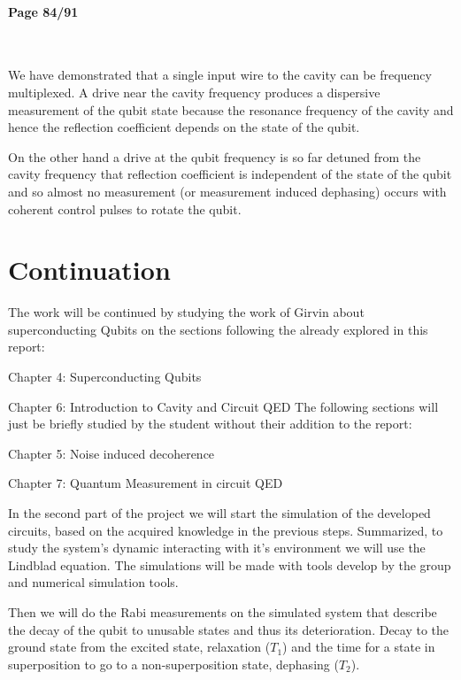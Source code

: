 \documentclass[12pt]{article}
\let\tempone\itemize
\let\temptwo\enditemize
\renewenvironment{itemize}{\tempone\setlength{\itemsep}{0pt}}{\temptwo}
\numberwithin{equation}{subsection}
\newcommand\page[1]{
{
\color{blue}\paragraph{
Page #1
}\mbox{}\\
}
}
\begin{document}
\page{84/91}

We have demonstrated that a single input wire to the cavity can be frequency multiplexed. 
A drive near the cavity frequency produces a dispersive measurement of the qubit state because the resonance frequency of the cavity and  hence the reflection coefficient depends on the state of the qubit. 

On the other hand a drive at the qubit frequency is so far detuned from the cavity frequency that reflection coefficient is independent of the state of the qubit and so almost no measurement (or measurement induced dephasing) occurs with coherent control pulses to rotate the qubit.


\section{Continuation}
The work will be continued by studying the work of Girvin about superconducting Qubits on the sections following the already explored in this report: 
\begin{itemize}
    \item Chapter 4: Superconducting Qubits
    \item Chapter 6: Introduction to Cavity and Circuit QED
\end{itemize}
The following sections will just be briefly studied by the student without their addition to the report:

\begin{itemize}
    \item Chapter 5: Noise induced decoherence
    \item Chapter 7: Quantum Measurement in circuit QED
\end{itemize}

In the second part of the project we will start the simulation of the developed circuits, based on the acquired knowledge in the previous steps. Summarized, to study the system's dynamic interacting with it's environment we will use the Lindblad equation. The simulations will be made with tools develop by the group and numerical simulation tools.

Then we will do the Rabi measurements on the simulated system that describe the decay of the qubit to unusable states and thus its deterioration. Decay to the ground state from the excited state, relaxation ($T_1$) and the time for a state in superposition to go to a non-superposition state, dephasing ($T_2$).
\end{document}
